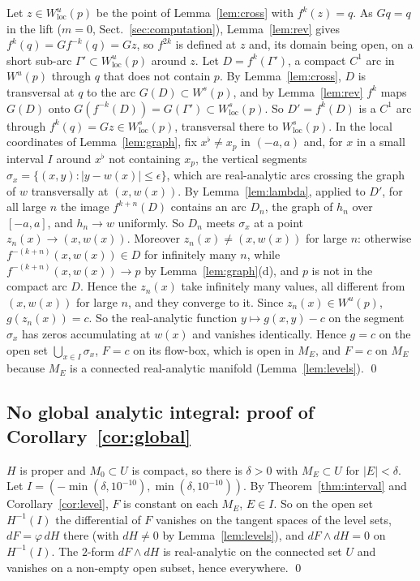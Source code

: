 \documentclass[11pt]{article}
\theoremstyle{definition}
\begin{document}
Let $z \in W^u_{\mathrm{loc}}(p)$ be the point of Lemma~\ref{lem:cross} with $f^k(z) = q$. As $Gq = q$ in the lift ($m = 0$, Sect.~\ref{sec:computation}), Lemma~\ref{lem:rev} gives $f^k(q) = Gf^{-k}(q) = Gz$, so $f^{2k}$ is defined at $z$ and, its domain being open, on a short sub-arc $\Gamma' \subset W^u_{\mathrm{loc}}(p)$ around $z$. Let $D = f^k(\Gamma')$, a compact $C^1$ arc in $W^u(p)$ through $q$ that does not contain $p$. By Lemma~\ref{lem:cross}, $D$ is transversal at $q$ to the arc $G(D) \subset W^s(p)$, and by Lemma~\ref{lem:rev} $f^k$ maps $G(D)$ onto $G(f^{-k}(D)) = G(\Gamma') \subset W^s_{\mathrm{loc}}(p)$. So $D' = f^k(D)$ is a $C^1$ arc through $f^k(q) = Gz \in W^s_{\mathrm{loc}}(p)$, transversal there to $W^s_{\mathrm{loc}}(p)$. In the local coordinates of Lemma~\ref{lem:graph}, fix $x^\flat \ne x_p$ in $(-a, a)$ and, for $x$ in a small interval $I$ around $x^\flat$ not containing $x_p$, the vertical segments $\sigma_x = \{(x, y) : |y - w(x)| \le \epsilon\}$, which are real-analytic arcs crossing the graph of $w$ transversally at $(x, w(x))$. By Lemma~\ref{lem:lambda}, applied to $D'$, for all large $n$ the image $f^{k+n}(D)$ contains an arc $D_n$, the graph of $h_n$ over $[-a, a]$, and $h_n \to w$ uniformly. So $D_n$ meets $\sigma_x$ at a point $z_n(x) \to (x, w(x))$. Moreover $z_n(x) \ne (x, w(x))$ for large $n$: otherwise $f^{-(k+n)}(x, w(x)) \in D$ for infinitely many $n$, while $f^{-(k+n)}(x, w(x)) \to p$ by Lemma~\ref{lem:graph}(d), and $p$ is not in the compact arc $D$. Hence the $z_n(x)$ take infinitely many values, all different from $(x, w(x))$ for large $n$, and they converge to it. Since $z_n(x) \in W^u(p)$, $g(z_n(x)) = c$. So the real-analytic function $y \mapsto g(x, y) - c$ on the segment $\sigma_x$ has zeros accumulating at $w(x)$ and vanishes identically. Hence $g = c$ on the open set $\bigcup_{x \in I}\sigma_x$, $F = c$ on its flow-box, which is open in $M_E$, and $F = c$ on $M_E$ because $M_E$ is a connected real-analytic manifold (Lemma~\ref{lem:levels}). \qed

\subsection{No global analytic integral: proof of Corollary~\ref{cor:global}}

$H$ is proper and $M_0 \subset U$ is compact, so there is $\delta > 0$ with $M_E \subset U$ for $|E| < \delta$. Let $I = (-\min(\delta, 10^{-10}), \min(\delta, 10^{-10}))$. By Theorem~\ref{thm:interval} and Corollary~\ref{cor:level}, $F$ is constant on each $M_E$, $E \in I$. So on the open set $H^{-1}(I)$ the differential of $F$ vanishes on the tangent spaces of the level sets, $dF = \varphi\,dH$ there (with $dH \ne 0$ by Lemma~\ref{lem:levels}), and $dF \wedge dH = 0$ on $H^{-1}(I)$. The $2$-form $dF \wedge dH$ is real-analytic on the connected set $U$ and vanishes on a non-empty open subset, hence everywhere. \qed
\end{document}
